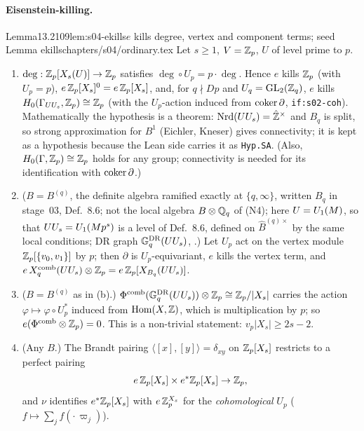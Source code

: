 \paragraph{Eisenstein-killing.}
\begin{quoted}{Lemma}{13.2}{109}{lem:s04-ekills}{$e$ kills degree, vertex and component terms; seed Lemma ekills}{chapters/s04/ordinary.tex}\label{rpt:lem:s04-ekills}
Let $s\ge1$, $V=\mathbb{Z}_p$, $U$ of level prime to $p$.
\begin{enumerate}[label=(\alph*)]
\item $\deg:\mathbb{Z}_p[X_s(U)]\to\mathbb{Z}_p$ satisfies $\deg\circ U_p=p\cdot\deg$. Hence $e$ kills $\mathbb{Z}_p$ (with $U_p=p$), $e\,\mathbb{Z}_p[X_s]^0=e\,\mathbb{Z}_p[X_s]$,
  and, for $q\nmid Dp$ and $U_q=\mathrm{GL}_2(\mathbb{Z}_q)$, $e$ kills $H_0(\Gamma_{UU_s},\mathbb{Z}_p)\cong\mathbb{Z}_p$ (with the $U_p$-action induced from
  $\operatorname{coker}\partial$, \texttt{if:s02-coh}).
   Mathematically the hypothesis is a theorem:
  $\mathrm{Nrd}(UU_s)=\hat{\mathbb{Z}}^\times$ and $B_q$ is split, so strong approximation for $B^1$ (Eichler, Kneser) gives connectivity; it is kept as
  a hypothesis because the Lean side carries it as \texttt{Hyp.SA}. (Also, $H_0(\Gamma,\mathbb{Z}_p)\cong\mathbb{Z}_p$ holds for any group; connectivity
  is needed for its identification with $\operatorname{coker}\partial$.)
\item ($B=B^{(q)}$, the definite algebra ramified exactly at $\{q,\infty\}$, written $B_q$ in stage~03, Def.~8.6; not
  the local algebra $B\otimes\mathbb{Q}_q$ of (N4); here $U=U_1(M)$, so that $UU_s=U_1(Mp^s)$ is a level of Def.~8.6, defined on
  $\hat B^{(q)\times}$ by the same local conditions; DR graph $\mathbb{G}^{\mathrm{DR}}_q(UU_s)$, .) Let $U_p$ act on the vertex module $\mathbb{Z}_p[\{v_0,v_1\}]$ by $p$; then
  $\partial$ is $U_p$-equivariant, $e$ kills the vertex term, and $e\,X^{\mathrm{comb}}_q(UU_s)\otimes\mathbb{Z}_p=e\,\mathbb{Z}_p[X_{B_q}(UU_s)]$.
\item ($B=B^{(q)}$ as in (b).) $\Phi^{\mathrm{comb}}(\mathbb{G}^{\mathrm{DR}}_q(UU_s))\otimes\mathbb{Z}_p\cong\mathbb{Z}_p/|X_s|$ carries the action $\varphi\mapsto\varphi\circ U_p^*$ induced from
  $\operatorname{Hom}(X,\mathbb{Z})$, which is multiplication by $p$; so $e(\Phi^{\mathrm{comb}}\otimes\mathbb{Z}_p)=0$. This is a non-trivial statement: $v_p|X_s|\ge 2s-2$.
\item (Any $B$.) The Brandt pairing $\langle[x],[y]\rangle=\delta_{xy}$ on $\mathbb{Z}_p[X_s]$ restricts to a perfect pairing
  \[e\,\mathbb{Z}_p[X_s]\times e^*\mathbb{Z}_p[X_s]\to\mathbb{Z}_p,\]
  and $\nu$ identifies $e^*\mathbb{Z}_p[X_s]$ with $e\,\mathbb{Z}_p^{X_s}$ for the \emph{cohomological} $U_p$ ($f\mapsto\sum_jf(\cdot\,\varpi_j)$).

\end{enumerate}
\end{quoted}
